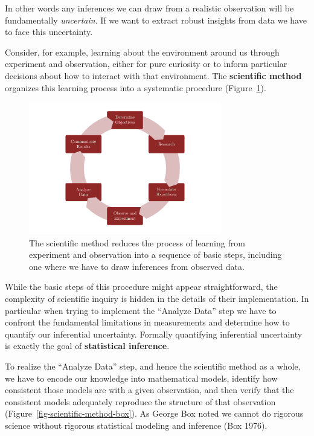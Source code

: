 \documentclass[
  letterpaper,
  DIV=11,
  numbers=noendperiod]{scrartcl}
\begin{document}
In other words any inferences we can draw from a realistic observation
will be fundamentally \emph{uncertain}. If we want to extract robust
insights from data we have to face this uncertainty.

Consider, for example, learning about the environment around us through
experiment and observation, either for pure curiosity or to inform
particular decisions about how to interact with that environment. The
\textbf{scientific method} organizes this learning process into a
systematic procedure (Figure~\ref{fig-scientific-method-nominal}).

\begin{figure}

{\centering \includegraphics[width=0.75\textwidth,height=\textheight]{figures/scientific_method/nominal/nominal.pdf}

}

\caption{\label{fig-scientific-method-nominal}The scientific method
reduces the process of learning from experiment and observation into a
sequence of basic steps, including one where we have to draw inferences
from observed data.}

\end{figure}

While the basic steps of this procedure might appear straightforward,
the complexity of scientific inquiry is hidden in the details of their
implementation. In particular when trying to implement the ``Analyze
Data'' step we have to confront the fundamental limitations in
measurements and determine how to quantify our inferential uncertainty.
Formally quantifying inferential uncertainty is exactly the goal of
\textbf{statistical inference}.

To realize the ``Analyze Data'' step, and hence the scientific method as
a whole, we have to encode our knowledge into mathematical models,
identify how consistent those models are with a given observation, and
then verify that the consistent models adequately reproduce the
structure of that observation (Figure~\ref{fig-scientific-method-box}).
As George Box noted we cannot do rigorous science without rigorous
statistical modeling and inference (Box 1976).
\end{document}
